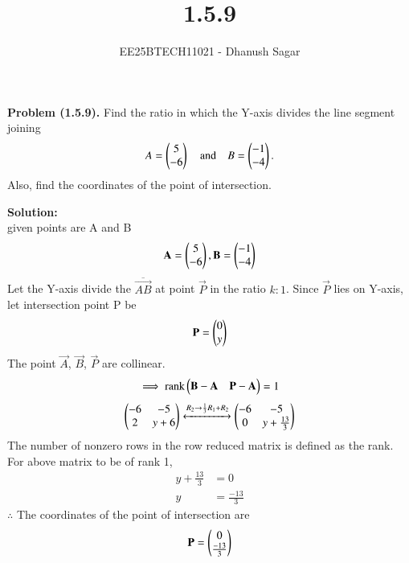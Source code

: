\documentclass[journal]{IEEEtran}
\begin{document}



\title{1.5.9}
\author{EE25BTECH11021 - Dhanush Sagar
}
{\let\newpage\relax\maketitle}

\renewcommand{\thefigure}{\theenumi}
\renewcommand{\thetable}{\theenumi}
\setlength{\intextsep}{10pt} %


\renewcommand{\thetable}{\theenumi}



\textbf{Problem (1.5.9).} Find the ratio in which the Y-axis divides the line segment joining
\begin{align}
    A=\myvec{5\\-6} \quad \text{and} \quad B=\myvec{-1\\-4}.
\end{align}
Also, find the coordinates of the point of intersection.

\textbf{Solution:}\\
 given points are A and B
\begin{align*} \vec{A} = \myvec{5 \\ -6}, \vec{B} = \myvec{-1 \\ -4} \end{align*}
Let the Y-axis divide the \(\overline{\vec{AB}}\) at point $\vec{P}$ in the ratio $k:1$.
Since $\vec{P}$ lies on Y-axis, let intersection point P be
\begin{align*}
\vec{P} = \myvec{0 \\ y}
\end{align*}
The point $\vec{A}$, $\vec{B}$, $\vec{P}$ are collinear.
\begin{align}
\implies \text{rank}\myvec{\vec{B}-\vec{A} & \vec{P}-\vec{A}} = 1
\end{align}
\begin{align}
\myvec{-6 & -5 \\ 2 & y+6} \xleftrightarrow[]{R_2 \rightarrow {\frac{1}{3}R_1 + R_2}}\myvec{-6 & -5 \\ 0 & y+\frac{13}{3}}  
\end{align}
The number of nonzero rows in the row reduced matrix is defined as the rank. For above matrix to be of rank 1,
\begin{align}
y+\frac{13}{3} &= 0 \\
y &= \frac{-13}{3}
\end{align}
$\therefore$ The coordinates of the point of intersection are 
\begin{align*}
\vec{P} = \myvec{0 \\ \frac{-13}{3}}
\end{align*}
\end{document}
